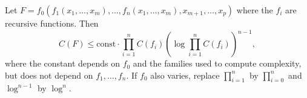 Let $F = f_0(f_1(x_1, \ldots, x_m), \ldots, f_n(x_1, \ldots, x_m), x_{m+1}, \ldots, x_p)$ where the $f_i$ are recursive functions. Then
$$C(F) \leqslant \text{const} \cdot \prod_{i=1}^{n} C(f_i) \left( \log \prod_{i=1}^{n} C(f_i) \right)^{n-1},$$
where the constant depends on $f_0$ and the families used to compute complexity, but does not depend on $f_1, \ldots, f_n$.
If $f_0$ also varies, replace $\prod_{i=1}^{n}$ by $\prod_{i=0}^{n}$ and $\log^{n-1}$ by $\log^n$.